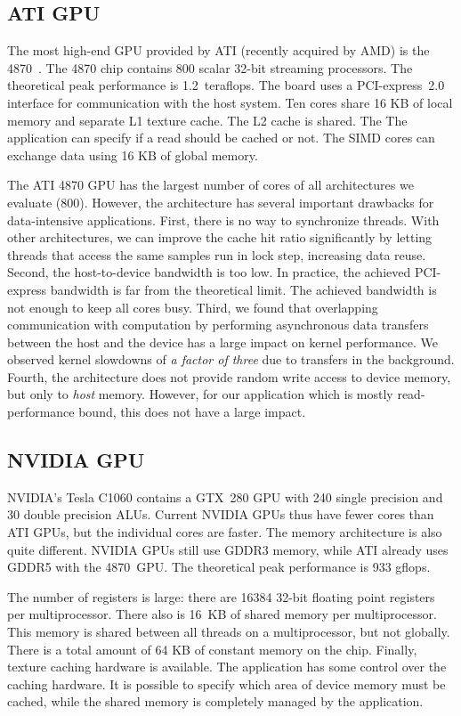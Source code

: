 \documentclass{article}
\begin{document}
\subsection{ATI GPU}

The most high-end GPU provided by ATI (recently acquired by AMD) is
the 4870~\cite{amd-manual}.  The 4870 chip contains 800 scalar 32-bit
streaming processors.  The theoretical peak performance is
1.2~teraflops. The board uses a PCI-express~2.0 interface
for communication with the host system.  Ten cores
share 16 KB of local memory and separate L1 texture cache.  The L2
cache is shared. The The application can specify if a read should be
cached or not.  The SIMD cores can exchange data using 16 KB of global
memory.

The ATI 4870 GPU has the largest number of cores of all architectures
we evaluate (800).  However, the architecture has several important
drawbacks for data-intensive applications.  First, there is no way to
synchronize threads. With other architectures, we can improve the
cache hit ratio significantly by letting threads that access the same
samples run in lock step, increasing data reuse.  Second, the
host-to-device bandwidth is too low. In practice, the achieved
PCI-express bandwidth is far from the theoretical limit. The achieved
bandwidth is not enough to keep all cores busy.  Third, we found that
overlapping communication with computation by performing asynchronous
data transfers between the host and the device has a large impact on
kernel performance. We observed kernel slowdowns of \emph{a factor of
  three} due to transfers in the background.  Fourth, the architecture
does not provide random write access to device memory, but only to
\emph{host} memory. However, for our application which is mostly
read-performance bound, this does not have a large impact.


\subsection{NVIDIA GPU}

NVIDIA's Tesla C1060 contains a GTX~280 GPU with 240 single precision
and 30 double precision ALUs.  Current NVIDIA GPUs thus have fewer
cores than ATI GPUs, but the individual cores are faster. The memory
architecture is also quite different. NVIDIA GPUs still use GDDR3
memory, while ATI already uses GDDR5 with the 4870~GPU.  The
theoretical peak performance is 933 gflops.

The number of registers is large: there are 16384 32-bit floating
point registers per multiprocessor. There also is 16~KB of shared
memory per multiprocessor.  This memory is shared between all threads
on a multiprocessor, but not globally.  There is a total amount of 64
KB of constant memory on the chip.  Finally, texture caching hardware
is available.  The application has some control over the caching
hardware.  It is possible to specify which area of device memory must
be cached, while the shared memory is completely managed by the
application.
\end{document}
